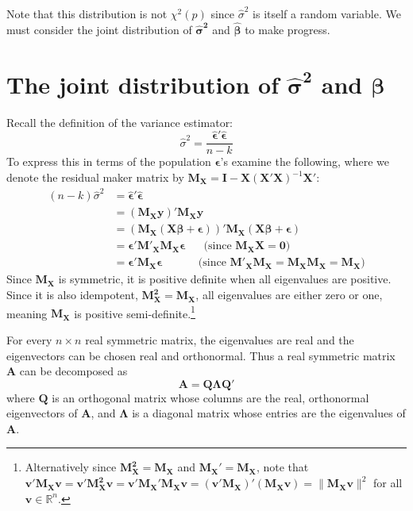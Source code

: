 \documentclass[DIV=14,titlepage=false]{scrreprt}
\begin{document}
Note that this distribution is not $\chi^2(p)$ since $\hat\sigma^2$ is itself a random variable. We must consider the joint distribution of $\boldsymbol{\hat\sigma^2}$ and $\boldsymbol{\hat\beta}$ to make progress.

\section{The joint distribution of $\boldsymbol{\hat\sigma^2}$ and $\boldsymbol{\hat\beta}$}
Recall the definition of the variance estimator: \[\hat\sigma^2 = \frac{\boldsymbol{\hat\epsilon}'\boldsymbol{\hat\epsilon}}{n-k}\]
To express this in terms of the population $\boldsymbol{\epsilon}$'s examine the following, where we denote the residual maker matrix by $\mathbf{M_X}=\mathbf{I}-\mathbf{X}(\mathbf{X}'\mathbf{X})^{-1}\mathbf{X}'$:
\begin{align*}
    (n-k)\hat\sigma^2&=\boldsymbol{\hat\epsilon}'\boldsymbol{\hat\epsilon}\\
    &= (\mathbf{M_X}\mathbf{y})'\mathbf{M_X}\mathbf{y} \\
    &= (\mathbf{M_X}(\mathbf{X}\boldsymbol{\beta}+\boldsymbol{\epsilon}))'\mathbf{M_X}(\mathbf{X}\boldsymbol{\beta}+\boldsymbol{\epsilon})\\
    &= \boldsymbol{\epsilon}'\mathbf{M'_X}\mathbf{M_X}\boldsymbol{\epsilon} \hspace{20pt} \text{(since $\mathbf{M_XX}=\mathbf{0}$)}\\
    &= \boldsymbol{\epsilon}'\mathbf{M_X}\boldsymbol{\epsilon} \hspace{39pt} \text{(since $\mathbf{M'_XM_X}=\mathbf{M_XM_X}=\mathbf{M_X}$)}
\end{align*}
 Since $\mathbf{M_X}$ is symmetric, it is positive definite when all eigenvalues are positive. Since it is also idempotent, $\mathbf{M^2_X}=\mathbf{M_X}$, all eigenvalues are either zero or one, meaning $\mathbf{M_X}$ is positive semi-definite.\footnote[1]{Alternatively since \( \mathbf{M_X^2} = \mathbf{M_X} \) and \( \mathbf{M_X}' = \mathbf{M_X} \), note that \( \mathbf{v}'\mathbf{M_Xv} = \mathbf{v}'\mathbf{M_X^2v} = \mathbf{v}'\mathbf{M_X}'\mathbf{M_Xv} = (\mathbf{v}'\mathbf{M_X})'(\mathbf{M_Xv}) = \|\mathbf{M_Xv}\|^2 \) for all \( \mathbf{v} \in \mathbb{R}^n \).
}

\begin{lemma}
    For every $n \times n$ real symmetric matrix, the eigenvalues are real and the eigenvectors can be chosen real and orthonormal. Thus a real symmetric matrix $\mathbf {A}$ can be decomposed as
    \[ \mathbf {A} =\mathbf {Q} \mathbf {\Lambda } \mathbf {Q'}\]
    where $\mathbf {Q}$ is an orthogonal matrix whose columns are the real, orthonormal eigenvectors of $\mathbf {A}$, and $\mathbf {\Lambda}$ is a diagonal matrix whose entries are the eigenvalues of $\mathbf {A}$. 
\end{lemma}
\end{document}
